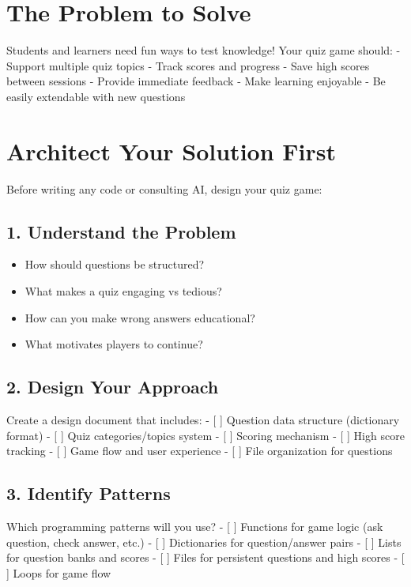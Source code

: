 \documentclass[
  letterpaper,
  DIV=11,
  numbers=noendperiod,
  oneside]{scrreprt}
\providecommand{\tightlist}{%
  \setlength{\itemsep}{0pt}\setlength{\parskip}{0pt}}\usepackage{longtable,booktabs,array}
\begin{document}
\section{The Problem to Solve}\label{the-problem-to-solve-7}

Students and learners need fun ways to test knowledge! Your quiz game
should: - Support multiple quiz topics - Track scores and progress -
Save high scores between sessions - Provide immediate feedback - Make
learning enjoyable - Be easily extendable with new questions

\section{Architect Your Solution
First}\label{architect-your-solution-first-7}

Before writing any code or consulting AI, design your quiz game:

\subsection{1. Understand the Problem}\label{understand-the-problem-7}

\begin{itemize}
\tightlist
\item
  How should questions be structured?
\item
  What makes a quiz engaging vs tedious?
\item
  How can you make wrong answers educational?
\item
  What motivates players to continue?
\end{itemize}

\subsection{2. Design Your Approach}\label{design-your-approach-7}

Create a design document that includes: - {[} {]} Question data
structure (dictionary format) - {[} {]} Quiz categories/topics system -
{[} {]} Scoring mechanism - {[} {]} High score tracking - {[} {]} Game
flow and user experience - {[} {]} File organization for questions

\subsection{3. Identify Patterns}\label{identify-patterns-7}

Which programming patterns will you use? - {[} {]} Functions for game
logic (ask question, check answer, etc.) - {[} {]} Dictionaries for
question/answer pairs - {[} {]} Lists for question banks and scores -
{[} {]} Files for persistent questions and high scores - {[} {]} Loops
for game flow
\end{document}
